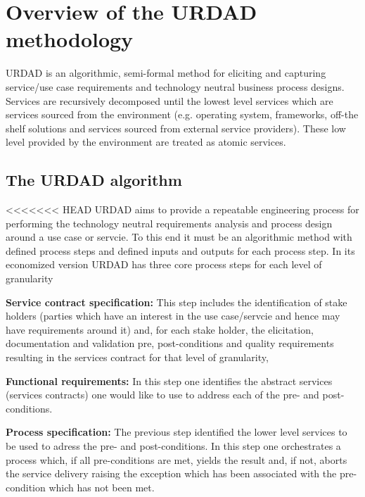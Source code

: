 \section{Overview of the URDAD methodology \label{sec:urdadMethodology}}

URDAD is an algorithmic, semi-formal method for eliciting and capturing service/use case requirements and technology neutral business process designs\cite{solms_urdad_2010}.
Services are recursively decomposed until the lowest level services which are services sourced from the environment (e.g. operating system, frameworks, off-the shelf solutions and services sourced from external service providers). These low level provided by the environment are treated as atomic services.

\subsection{The URDAD algorithm}

<<<<<<< HEAD
URDAD aims to provide a repeatable engineering process for performing the technology neutral requirements analysis and process design around a use case or servcie. To this end it must be an algorithmic method with defined process steps and defined inputs and outputs for each process step. In its economized version URDAD has three core process steps for each level of granularity
\begin{orderedlist}
 \item {\bf Service contract specification:} This step includes the identification of stake holders (parties which have an interest in the use case/servcie and hence may have requirements around it) and, for each stake holder, the elicitation, documentation and validation pre, post-conditions and quality requirements resulting in the services contract for that level of granularity, 
 \item {\bf Functional requirements:} In this step one identifies the abstract services (services contracts) one would like to use to address each of the pre- and post-conditions. 
 \item {\bf Process specification:} The previous step identified the lower level services to be used to adress the pre- and post-conditions. In this step one orchestrates a process which, if all pre-conditions are met, yields the result and, if not, aborts the service delivery raising the exception which has been associated with the pre-condition which has not been met.
\end{orderedlist}

